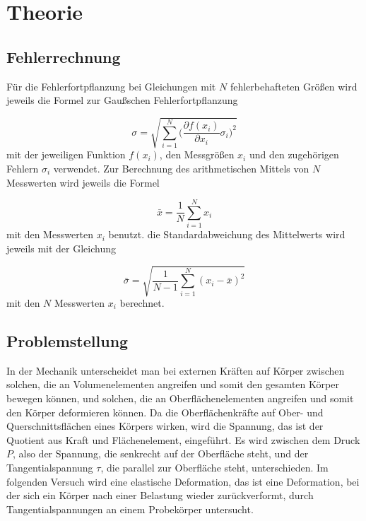 \section{Theorie}
\label{sec:Theorie}


\subsection{Fehlerrechnung}

Für die Fehlerfortpflanzung bei Gleichungen mit $N$ fehlerbehafteten Größen
wird jeweils die Formel zur Gaußschen Fehlerfortpflanzung

\begin{equation}
  \sigma = \sqrt{\sum_{i=1}^{N}\biggl(\frac{\partial f(x_i)}{\partial x_i}
  \sigma_i\biggr)^2}
\end{equation}
mit der jeweiligen Funktion $f(x_i)$, den Messgrößen $x_i$ und den
zugehörigen Fehlern $\sigma_i$ verwendet.
Zur Berechnung des arithmetischen Mittels von $N$ Messwerten wird jeweils die
Formel

\begin{equation}
  \bar{x} = \frac{1}{N}\sum_{i=1}^{N}x_i
\end{equation}
mit den Messwerten $x_i$ benutzt.
die Standardabweichung des Mittelwerts wird jeweils mit der Gleichung

\begin{equation}
  \bar{\sigma} = \sqrt{\frac{1}{N-1}\sum_{i=1}^{N}(x_i - \bar{x})^2}
\end{equation}
mit den $N$ Messwerten $x_i$ berechnet.


\subsection{Problemstellung}

In der Mechanik unterscheidet man bei externen Kräften auf Körper zwischen
solchen, die an Volumenelementen angreifen und somit den gesamten Körper
bewegen können, und solchen, die an Oberflächenelementen angreifen und somit
den Körper deformieren können.
Da die Oberflächenkräfte auf Ober- und Querschnittsflächen eines Körpers wirken,
wird die Spannung, das ist der Quotient aus Kraft und Flächenelement,
eingeführt.
Es wird zwischen dem Druck $P$, also der Spannung, die senkrecht auf der
Oberfläche steht, und der Tangentialspannung $\tau$, die parallel zur Oberfläche
steht, unterschieden.
Im folgenden Versuch wird eine elastische Deformation, das ist eine
Deformation, bei der sich ein Körper nach einer Belastung wieder zurückverformt,
durch Tangentialspannungen an einem Probekörper untersucht.


